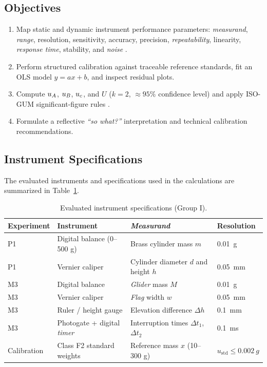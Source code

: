 \documentclass[a4paper, 12pt]{article}
\begin{document}
        \subsection{Objectives}
        \begin{enumerate}
            \item Map static and dynamic instrument performance parameters: \textit{measurand}, \textit{range}, resolution, sensitivity, accuracy, precision, \textit{repeatability}, linearity, \textit{response time}, stability, and \textit{noise} \parencite{JCGM2012VIM}.
            \item Perform structured calibration against traceable reference standards, fit an OLS model $y=ax+b$, and inspect residual plots.
            \item Compute $u_{A}$, $u_{B}$, $u_{c}$, and $U$ ($k=2$, $\approx 95\%$ confidence level) and apply ISO-GUM significant-figure rules \parencite{JCGM2008GUM}.
            \item Formulate a reflective \textit{``so what?''} interpretation and technical calibration recommendations.
        \end{enumerate}

        \subsection{Instrument Specifications}
        The evaluated instruments and specifications used in the calculations are summarized in Table~\ref{tab:profil}.
\begin{table}[H]
\centering
\singlespacing
\caption{Evaluated instrument specifications (Group I).}
\label{tab:profil}
\small
\begin{tabularx}{\textwidth}{@{}l l X l@{}}
\toprule
\textbf{Experiment} & \textbf{Instrument} & \textbf{\textit{Measurand}} & \textbf{Resolution}\\
\midrule
P1 & Digital balance (0--500 g) & Brass cylinder mass $m$ & \SI{0.01}{g}\\
P1 & Vernier caliper & Cylinder diameter $d$ and height $h$ & \SI{0.05}{mm}\\
M3 & Digital balance & \textit{Glider} mass $M$ & \SI{0.01}{g}\\
M3 & Vernier caliper & \textit{Flag} width $w$ & \SI{0.05}{mm}\\
M3 & Ruler / height gauge & Elevation difference $\Delta h$ & \SI{0.1}{mm}\\
M3 & Photogate + digital \textit{timer} & Interruption times $\Delta t_1$, $\Delta t_2$ & \SI{0.1}{ms}\\
Calibration & Class F2 standard weights & Reference mass $x$ (10--300 g) & $u_{\mathrm{std}}\le\SI{0.002}{g}$\\
\bottomrule
\end{tabularx}
\end{table}
\end{document}
